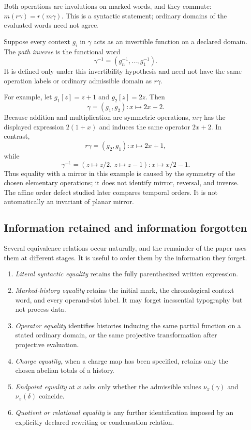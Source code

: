 Both operations are involutions on marked words, and they commute:
$m(r\gamma)=r(m\gamma)$.  This is a syntactic statement; ordinary domains of
the evaluated words need not agree.

\begin{definition}
\label{def:path-inverse}
Suppose every context $g_i$ in $\gamma$ acts as an invertible function on a
declared domain.  The \emph{path inverse} is the functional word
\[
  \gamma^{-1}=(g_n^{-1},\ldots,g_1^{-1}).
\]
It is defined only under this invertibility hypothesis and need not have the
same operation labels or ordinary admissible domain as $r\gamma$.
\end{definition}

For example, let $g_1[z]=z+1$ and $g_2[z]=2z$.  Then
\[
  \gamma=(g_1,g_2)\colon x\longmapsto2x+2.
\]
Because addition and multiplication are symmetric operations,
$m\gamma$ has the displayed expression $2(1+x)$ and induces the same operator
$2x+2$.  In contrast,
\[
  r\gamma=(g_2,g_1)\colon x\longmapsto2x+1,
\]
while
\[
  \gamma^{-1}=(z\mapsto z/2,\ z\mapsto z-1)
  \colon x\longmapsto x/2-1.
\]
Thus equality with a mirror in this example is caused by the symmetry of the
chosen elementary operations; it does not identify mirror, reversal, and
inverse.  The affine order defect studied later compares temporal orders.  It
is not automatically an invariant of planar mirror.

\subsection{Information retained and information forgotten}

Several equivalence relations occur naturally, and the remainder of the paper
uses them at different stages.  It is useful to order them by the information
they forget.

\begin{enumerate}
  \item \emph{Literal syntactic equality} retains the fully parenthesized
  written expression.
  \item \emph{Marked-history equality} retains the initial mark, the
  chronological context word, and every operand-slot label.  It may forget
  inessential typography but not process data.
  \item \emph{Operator equality} identifies histories inducing the same
  partial function on a stated ordinary domain, or the same projective
  transformation after projective evaluation.
  \item \emph{Charge equality}, when a charge map has been specified, retains
  only the chosen abelian totals of a history.
  \item \emph{Endpoint equality} at $x$ asks only whether the admissible values
  $\nu_x(\gamma)$ and $\nu_x(\delta)$ coincide.
  \item \emph{Quotient or relational equality} is any further identification
  imposed by an explicitly declared rewriting or condensation relation.
\end{enumerate}

